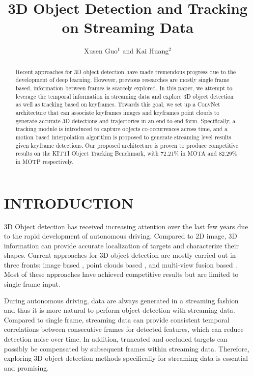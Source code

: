 \documentclass[letterpaper, 10 pt, conference]{ieeeconf}  %
\title{\LARGE \bf
3D Object Detection and Tracking on Streaming Data
}
\author{Xusen Guo$^{1}$ and Kai Huang$^{2}$%
}
\begin{document}
\maketitle
\thispagestyle{empty}
\pagestyle{empty}


\begin{abstract}

Recent approaches for 3D object detection have made tremendous progress due to the development of deep learning. However, previous researches are mostly single frame based, information between frames is scarcely explored. In this paper, we attempt to leverage the temporal information in streaming data and explore 3D object detection as well as tracking based on keyframes. Towards this goal, we set up a ConvNet architecture that can associate keyframes images and keyframes point clouds to generate accurate 3D detections and trajectories in an end-to-end form. Specifically, a tracking module is introduced to capture objects co-occurrences across time, and a motion based interpolation algorithm is proposed to generate streaming level results given keyframe detections. Our proposed architecture is proven to produce competitive results on the KITTI Object Tracking Benchmark, with 72.21\% in MOTA and 82.29\% in MOTP respectively.
\end{abstract}

\section{INTRODUCTION}

3D Object detection has received increasing attention over the last few years due to the rapid development of autonomous driving. Compared to 2D image, 3D information can provide accurate localization of targets and characterize their shapes. Current approaches for 3D object detection are mostly carried out in three fronts: image based \cite{7780605, chen20183d}, point clouds based \cite{zhou2018voxelnet,yang2018pixor,simon2018complex}, and multi-view fusion based \cite{chen2017multi,ku2018joint}. Most of these approaches have achieved competitive results but are limited to single frame input.

During autonomous driving, data are always generated in a streaming fashion and thus it is more natural to perform object detection with streaming data. Compared to single frame, streaming data can provide consistent temporal correlations between consecutive frames for detected features, which can reduce detection noise over time. In addition, truncated and occluded targets can possibly be compensated by subsequent frames within streaming data. Therefore, exploring 3D object detection methods specifically for streaming data is essential and promising.
\end{document}
